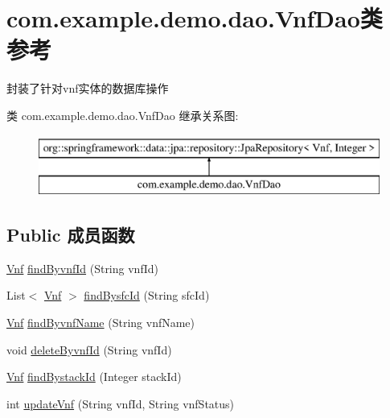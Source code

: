 \hypertarget{interfacecom_1_1example_1_1demo_1_1dao_1_1_vnf_dao}{}\section{com.\+example.\+demo.\+dao.\+Vnf\+Dao类 参考}
\label{interfacecom_1_1example_1_1demo_1_1dao_1_1_vnf_dao}


封装了针对vnf实体的数据库操作  


类 com.\+example.\+demo.\+dao.\+Vnf\+Dao 继承关系图\+:\begin{figure}[H]
\begin{center}
\leavevmode
\includegraphics[height=2.000000cm]{interfacecom_1_1example_1_1demo_1_1dao_1_1_vnf_dao}
\end{center}
\end{figure}
\subsection*{Public 成员函数}
\begin{DoxyCompactItemize}
\item 
\mbox{\hyperlink{classcom_1_1example_1_1demo_1_1modular_1_1_vnf}{Vnf}} \mbox{\hyperlink{interfacecom_1_1example_1_1demo_1_1dao_1_1_vnf_dao_a9e9c52e14f49ae3d444f707e72404b6e}{find\+Byvnf\+Id}} (String vnf\+Id)
\item 
List$<$ \mbox{\hyperlink{classcom_1_1example_1_1demo_1_1modular_1_1_vnf}{Vnf}} $>$ \mbox{\hyperlink{interfacecom_1_1example_1_1demo_1_1dao_1_1_vnf_dao_a424572e38d0c632160d191a80cfaaf74}{find\+Bysfc\+Id}} (String sfc\+Id)
\item 
\mbox{\hyperlink{classcom_1_1example_1_1demo_1_1modular_1_1_vnf}{Vnf}} \mbox{\hyperlink{interfacecom_1_1example_1_1demo_1_1dao_1_1_vnf_dao_acf520215feea51495bceb2d619b43fcd}{find\+Byvnf\+Name}} (String vnf\+Name)
\item 
void \mbox{\hyperlink{interfacecom_1_1example_1_1demo_1_1dao_1_1_vnf_dao_a72407fbd69fe4d06155c13dda055a12b}{delete\+Byvnf\+Id}} (String vnf\+Id)
\item 
\mbox{\hyperlink{classcom_1_1example_1_1demo_1_1modular_1_1_vnf}{Vnf}} \mbox{\hyperlink{interfacecom_1_1example_1_1demo_1_1dao_1_1_vnf_dao_a26d9e02b3caede0d520c3922c1c3e869}{find\+Bystack\+Id}} (Integer stack\+Id)
\item 
int \mbox{\hyperlink{interfacecom_1_1example_1_1demo_1_1dao_1_1_vnf_dao_aa7ad37f04a3a5eae0a9d2fc40606d44d}{update\+Vnf}} (String vnf\+Id, String vnf\+Status)
\end{DoxyCompactItemize}


